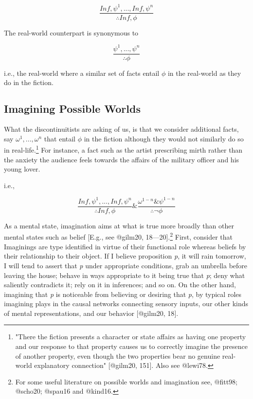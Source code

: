 \documentclass[
  letterpaper,
  DIV=11,
  numbers=noendperiod]{scrartcl}
\theoremstyle{remark}
\begin{document}
\[\frac{In f, \psi^{1}, . . ., In f, \psi^{n}}{\therefore In f, \phi}\]

\noindent The real-world counterpart is synonymous to

\[\frac{\psi^{1}, . . ., \psi^{n}}{\therefore\phi}\]

\noindent i.e., the real-world where a similar set of facts entail
\(\phi\) in the real-world as they do in the fiction.

\subsection{Imagining Possible Worlds}\label{imagining-possible-worlds}

What the discontinuitists are asking of us, is that we consider
additional facts, say \(\omega^{1}, . . ., \omega^{n}\) that entail
\(\phi\) in the fiction although they would not similarly do so in
real-life.\footnote{"There the fiction presents a character or state
  affairs as having one property and our response to that property
  causes us to correctly imagine the presence of another property, even
  though the two properties bear no genuine real-world explanatory
  connection" {[}@gilm20, 151{]}. Also see @lewi78.} For instance, a
fact such as the artist prescribing mirth rather than the anxiety the
audience feels towards the affairs of the military officer and his young
lover.

\noindent i.e.,

\[\frac{In f, \psi^{1}, . . ., In f, \psi^{n}}{\therefore In f, \phi} \& \frac{\omega^{1-n} \& \psi^{1-n}}{\therefore\neg\phi}\]

As a mental state, imagination aims at what is true more broadly than
other mental states such as belief {[}E.g., see @gilm20,
18---20{]}.\footnote{For some useful literature on possible worlds and
  imagination see, @fitt98; @scho20; @spau16 and @kind16.} First,
consider that Imaginings are type identified in virtue of their
functional role whereas beliefs by their relationship to their object.
If I believe proposition \emph{p}, it will rain tomorrow, I will tend to
assert that \emph{p} under appropriate conditions, grab an umbrella
before leaving the house; behave in ways appropriate to it being true
that \emph{p}; deny what saliently contradicts it; rely on it in
inferences; and so on. On the other hand, imagining that \emph{p} is
noticeable from believing or desiring that \emph{p}, by typical roles
imagining plays in the causal networks connecting sensory inputs, our
other kinds of mental representations, and our behavior {[}@gilm20,
18{]}.
\end{document}
